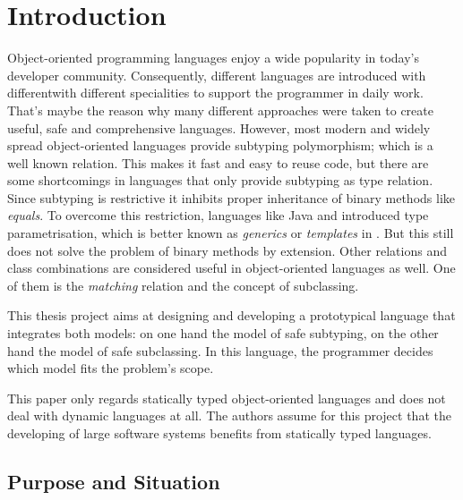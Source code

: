 \chapter{Introduction}
Object-oriented programming languages enjoy a wide popularity in today's
developer community. Consequently, different languages are introduced with differentwith different
specialities to support the programmer in daily work. That's maybe
the reason why many different approaches were taken to create useful, safe
and comprehensive languages. However, most modern and widely spread
object-oriented languages provide subtyping polymorphism; which is a well
known relation. This makes
it fast and easy to reuse code, but there are some shortcomings in languages
that only provide subtyping as type relation. Since subtyping
is restrictive it inhibits proper inheritance of binary methods like
\emph{equals}. To overcome this restriction, languages like Java and \cs
introduced type parametrisation, which is better known as \emph{generics}
or \emph{templates} in \cpp. But this still does not solve the problem
of binary methods by extension. Other relations and class combinations
are considered useful in object-oriented languages as well. One of them
is the \emph{matching} relation and the concept of subclassing.

This thesis project aims at designing and developing a prototypical
language that integrates both models: on one hand the model of safe
subtyping, on the other hand the model of safe subclassing. In this language,
the programmer decides which model fits the problem's scope.

This paper only regards statically typed object-oriented languages and does
not deal with dynamic languages at all. The authors assume for this project
that the developing of large software systems benefits from statically
typed languages.

\section{Purpose and Situation}
